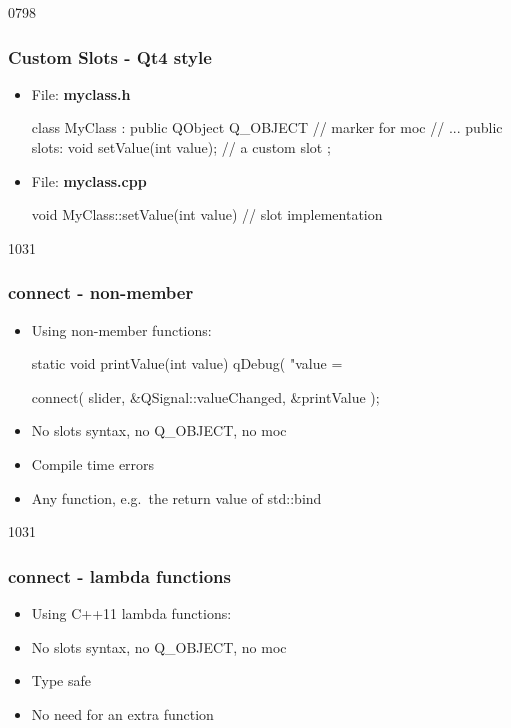 \begin{slide}[fragile]{0798}\frametitle{Custom Slots - Qt4 style}
 \label{codeForSlots1}
\begin{itemize}
\item File: \textbf{myclass.h}
  \begin{cpp}
class MyClass : public QObject
{
  Q_OBJECT // marker for moc
  // ...
public slots:
  void setValue(int value); // a custom slot
};
  \end{cpp}\medskip
\item File: \textbf{myclass.cpp}
  \begin{cpp}
void MyClass::setValue(int value) {
  // slot implementation
}
  \end{cpp}
\end{itemize}
\end{slide}

\begin{slide}[fragile]{1031}\frametitle{connect - non-member }
  \begin{itemize}
\item Using non-member functions:\\
\begin{cpp}
static void printValue(int value) {
  qDebug( "value = %
}

connect( slider, &QSignal::valueChanged, &printValue );
\end{cpp}\medskip

\item[] \advantage No slots syntax, no Q\_OBJECT, no moc
\item[] \advantage Compile time errors
\item[] \advantage Any function, e.g.\ the return value of std::bind
\end{itemize}
\bigskip\bigskip
\end{slide}

\begin{slide}[fragile]{1031}\frametitle{connect - lambda functions}
  \begin{itemize}
\item Using C++11 lambda functions:\\
\medskip
\item[] \advantage No slots syntax, no Q\_OBJECT, no moc
\item[] \advantage Type safe
\item[] \advantage No need for an extra function
  \end{itemize}
\end{slide}


